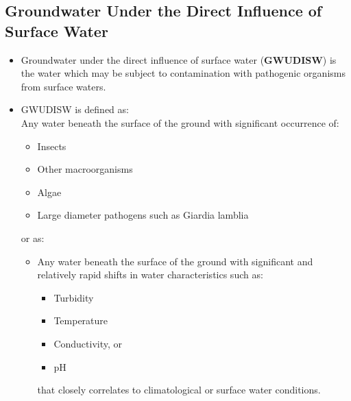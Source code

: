 \subsection{Groundwater Under the Direct  Influence  of  Surface  Water}
\begin{itemize}
\item Groundwater under the direct  influence  of  surface  water (\textbf{GWUDISW}) is the water which may be subject to contamination with pathogenic organisms from surface waters. 
\item GWUDISW is defined as:\\
Any water beneath the surface of the ground with significant occurrence of:\\
\begin{itemize}
\item Insects 
\item Other macroorganisms
\item Algae
\item Large diameter pathogens such as Giardia lamblia
\end{itemize}
\vspace{0.3cm}
or as:\\
\begin{itemize}
\item Any water beneath the surface of the ground with significant and relatively rapid shifts in water characteristics such as:
\begin{itemize}
\item Turbidity
\item Temperature
\item Conductivity, or
\item pH
\end{itemize}
that closely correlates to climatological or surface water conditions.     
\end{itemize}
\end{itemize}

